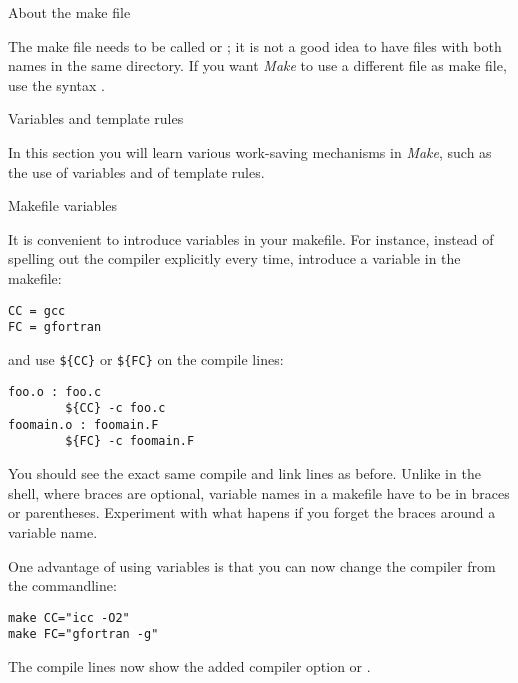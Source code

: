 
 {About the make file}

The make file needs to be called  or
; it is not a good idea to have files with both names in
the same directory.
If you want \emph{Make} to use a different file as make file, use the
syntax .

 {Variables and template rules}

\begin{purpose}
  In this section you will learn various work-saving mechanisms in
  \emph{Make}, such as the use of variables and of template rules.
\end{purpose}

 {Makefile variables}

It is convenient to introduce variables in your makefile.
For instance, 
instead of spelling out the compiler explicitly every time, introduce a
variable in the makefile:
\begin{verbatim}
CC = gcc
FC = gfortran
\end{verbatim}
and use \verb+${CC}+ or \verb+${FC}+ on the compile lines:
\begin{verbatim}
foo.o : foo.c
        ${CC} -c foo.c
foomain.o : foomain.F
        ${FC} -c foomain.F
\end{verbatim}
  {You should see the exact same compile and link lines as before.}
  {Unlike in the shell, where braces are optional, variable names in a
    makefile have to be in
    braces or parentheses. Experiment with what hapens if you forget
    the braces around a variable name.}

One
advantage of using variables is that you can now change the compiler
from the commandline:
\begin{verbatim}
make CC="icc -O2"
make FC="gfortran -g"
\end{verbatim}

  {The compile lines now show the added compiler option  or .}{}

